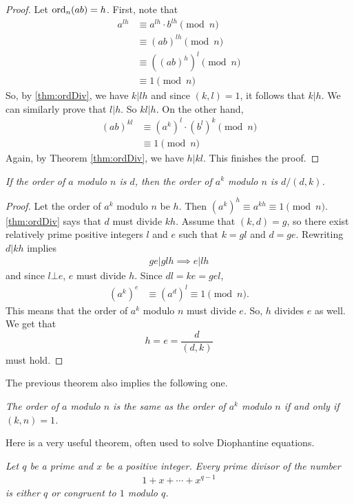 \documentclass{subfile}
\begin{document}
	\begin{proof}
		Let $\operatorname{ord}_n(ab)=h$. First, note that
			\begin{align*}
				a^{lh}
					& \equiv a^{lh}\cdot b^{lh}\pmod{n}\\
					& \equiv (ab)^{lh}\pmod{n}\\
					& \equiv \left((ab)^h\right)^l\pmod{n}\\
					& \equiv 1 \pmod n
			\end{align*}
		So, by \autoref{thm:ordDiv}, we have $k|lh$ and since $(k,l)=1$, it follows that $k|h$. We can similarly prove that $l|h$. So $kl|h$. On the other hand,
			\begin{align*}
				(ab)^{kl}
					& \equiv (a^k)^l \cdot (b^l)^k\pmod{n}\\
					& \equiv 1 \pmod n
			\end{align*}
		Again, by Theorem \eqref{thm:ordDiv}, we have $h|kl$. This finishes the proof.
	\end{proof}

	\begin{theorem}\slshape
		If the order of $a$ modulo $n$ is $d$, then the order of $a^k$ modulo $n$ is $d/{(d,k)}$.
	\end{theorem}

	\begin{proof}
		Let the order of $a^k$ modulo $n$ be $h$. Then $\left(a^k\right)^h \equiv a^{kh} \equiv 1\pmod n$. \autoref{thm:ordDiv} says that $d$ must divide $kh$. Assume that $(k,d)=g$, so there exist relatively prime positive integers $l$ and $e$ such that $k=gl$ and $d=ge$. Rewriting $d | kh$ implies
			\begin{align*}
				ge|glh \implies e|lh
			\end{align*}
		and since $l\bot e$, $e$ must divide $h$. Since $dl=ke=gel$,
			\begin{align*}
				\left(a^k\right)^{e} & \equiv \left(a^d\right)^{l} \equiv 1\pmod n.
			\end{align*}
		This means that the order of $a^k$ modulo $n$ must divide $e$. So, $h$ divides $e$ as well. We get that $$h=e=\dfrac{d}{(d,k)}$$ must hold.
	\end{proof}
The previous theorem also implies the following one.
	\begin{theorem}\slshape
		The order of $a$ modulo $n$ is the same as the order of $a^k$ modulo $n$ if and only if $(k,n)=1$.
	\end{theorem}
Here is a very useful theorem, often used to solve Diophantine equations.
	\begin{theorem}\label{thm:cyclodiv}\slshape
		Let $q$ be a prime and $x$ be a positive integer. Every prime divisor of the number
			\begin{align*}
				1+x+\cdots+x^{q-1}
			\end{align*}
		is either $q$ or congruent to $1$ modulo $q$.
	\end{theorem}
\end{document}
